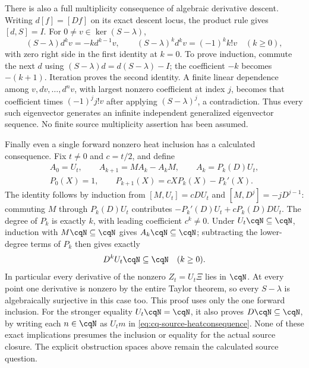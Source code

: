 There is also a full multiplicity consequence of algebraic derivative
descent. Writing $d[f]=[Df]$ on its exact descent locus, the product
rule gives $[d,S]=I$. For $0\ne v\in\ker(S-\lambda)$,
\begin{equation}\label{eq:cq-source-weylladder}
 (S-\lambda)d^kv=-k d^{k-1}v,
 \qquad (S-\lambda)^kd^kv=(-1)^k k!v\quad(k\geq0),
\end{equation}
with zero right side in the first identity at $k=0$.
To prove induction, commute the next $d$ using
$(S-\lambda)d=d(S-\lambda)-I$; the coefficient $-k$ becomes
$-(k+1)$. Iteration proves the second identity. A finite linear
dependence among $v,dv,\ldots,d^nv$, with largest nonzero
coefficient at index $j$, becomes that coefficient times
$(-1)^j j!v$ after applying $(S-\lambda)^j$, a contradiction.
Thus every such eigenvector generates an infinite independent
generalized eigenvector sequence. No finite source multiplicity
assertion has been assumed.

Finally even a single forward nonzero heat inclusion has a calculated
consequence. Fix $t\ne0$ and $c=t/2$, and define
\begin{equation}\label{eq:cq-source-heatcommutator}
 \begin{gathered}
 A_0=U_t,\qquad A_{k+1}=MA_k-A_kM,\qquad A_k=P_k(D)U_t,\\
 P_0(X)=1,\qquad P_{k+1}(X)=cX P_k(X)-P_k'(X).
 \end{gathered}
\end{equation}
The identity follows by induction from $[M,U_t]=cDU_t$ and
$[M,D^j]=-jD^{j-1}$: commuting $M$ through $P_k(D)U_t$
contributes $-P_k'(D)U_t+cP_k(D)DU_t$.
The degree of $P_k$ is exactly $k$, with leading coefficient
$c^k\ne0$. Under $U_t\cqN\subseteq\cqN$, induction with
$M\cqN\subseteq\cqN$ gives $A_k\cqN\subseteq\cqN$;
subtracting the lower-degree terms of $P_k$ then gives exactly
\begin{equation}\label{eq:cq-source-heatconsequence}
 D^kU_t\cqN\subseteq\cqN\quad(k\geq0).
\end{equation}
In particular every derivative of the nonzero $Z_t=U_t\Xi$ lies
in $\cqN$. At every point one derivative is nonzero by the entire
Taylor theorem, so every $S-\lambda$ is algebraically surjective
in this case too. This proof uses only the one forward inclusion.
For the stronger equality $U_t\cqN=\cqN$, it also proves
$D\cqN\subseteq\cqN$, by writing each $n\in\cqN$ as
$U_tm$ in \eqref{eq:cq-source-heatconsequence}. None of these
exact implications presumes the inclusion or equality for the actual
source closure. The explicit obstruction spaces above remain the
calculated source question.


